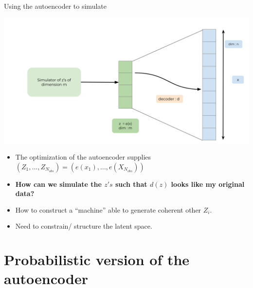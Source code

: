 \documentclass[
  12pt,
  ignorenonframetext,
  compress]{beamer}
\begin{document}
\begin{frame}{Using the autoencoder to simulate}
\begin{center}\includegraphics[width=0.7\linewidth]{images/VarAutoencoder} \end{center}

\begin{itemize}
\item
  The optimization of the autoencoder supplies
  \((Z_1, \dots, Z_{N_{obs}}) = (e(x_1), \dots, e(X_{N_{obs}}))\)
\item
  \textbf{How can we simulate the \(z's\) such that \(d(z)\) looks like
  my original data?}
\item
  How to construct a ``machine'' able to generate coherent other
  \(Z_i\).
\item
  Need to constrain/ structure the latent space.
\end{itemize}
\end{frame}

\begin{frame}
\end{frame}

\hypertarget{probabilistic-version-of-the-autoencoder}{%
\section{Probabilistic version of the
autoencoder}\label{probabilistic-version-of-the-autoencoder}}
\end{document}
